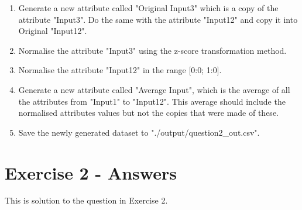 \documentclass{scrreprt}
\begin{document}
\begin{enumerate}
	\item Generate a new attribute called "Original Input3" which is a copy of the attribute "Input3". Do the same with the attribute "Input12" and copy it into Original "Input12".
	\item Normalise the attribute "Input3" using the z-score transformation method.
	\item Normalise the attribute "Input12" in the range [0:0; 1:0].
	\item Generate a new attribute called "Average Input", which is the average of all the attributes
	from "Input1" to "Input12". This average should include the normalised attributes values but not the copies that were made of these.
	\item Save the newly generated dataset to "./output/question2\_out.csv".
\end{enumerate}



\section{Exercise 2 - Answers}
This is solution to the question in Exercise 2. 
\end{document}
